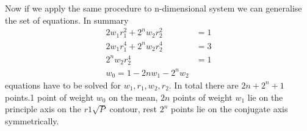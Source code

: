\documentclass[landscape]{slides}
\begin{document}
 \begin{slide}
 Now if we apply the same procedure to n-dimensional system we can generalise the set of equations. In summary 
 \begin{align*}
 2w_1r_1^2+2^nw_2r_2^2&=1\\
  2w_1r_1^4+2^nw_2r_2^4&=3\\
 2^nw_2r_2^4&=1\\
 w_0=1-2nw_1-2^nw_2
 \end{align*} 
 equations have to be solved for $w_1,r_1,w_2,r_2$. In total there are {\bf $2n+2^n+1$} points.1 point of weight $w_0$ on the mean, $2n$ points of weight $w_1$ lie on the principle axis on the $r1\sqrt{P}$ contour, rest $2^n$ points lie on the conjugate axis symmetrically. \newline\newline
   	\end{slide}
\end{document}

